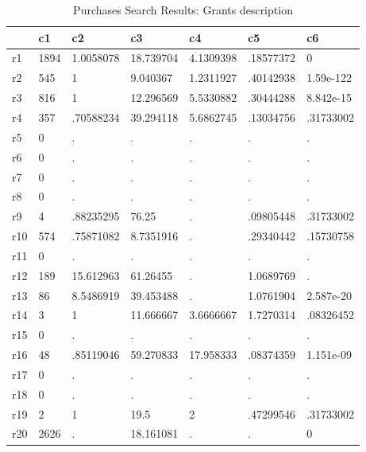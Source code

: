\begin{table}[htbp]
\caption{\label{taba3} Purchases Search Results: Grants description}\centering\medskip
\begin{tabular}{|l|l|l|l|l|l|l|}\hline  
 & c1  & c2  & c3  & c4  & c5  & c6  \\ \hline  
r1 & 1894 & 1.0058078 & 18.739704 & 4.1309398 & .18577372 & 0 \\ \hline 
r2 & 545 & 1 & 9.040367 & 1.2311927 & .40142938 & 1.59e-122 \\ \hline 
r3 & 816 & 1 & 12.296569 & 5.5330882 & .30444288 & 8.842e-15 \\ \hline 
r4 & 357 & .70588234 & 39.294118 & 5.6862745 & .13034756 & .31733002 \\ \hline 
r5 & 0 & . & . & . & . & . \\ \hline 
r6 & 0 & . & . & . & . & . \\ \hline 
r7 & 0 & . & . & . & . & . \\ \hline 
r8 & 0 & . & . & . & . & . \\ \hline 
r9 & 4 & .88235295 & 76.25 & . & .09805448 & .31733002 \\ \hline 
r10 & 574 & .75871082 & 8.7351916 & . & .29340442 & .15730758 \\ \hline 
r11 & 0 & . & . & . & . & . \\ \hline 
r12 & 189 & 15.612963 & 61.26455 & . & 1.0689769 & . \\ \hline 
r13 & 86 & 8.5486919 & 39.453488 & . & 1.0761904 & 2.587e-20 \\ \hline 
r14 & 3 & 1 & 11.666667 & 3.6666667 & 1.7270314 & .08326452 \\ \hline 
r15 & 0 & . & . & . & . & . \\ \hline 
r16 & 48 & .85119046 & 59.270833 & 17.958333 & .08374359 & 1.151e-09 \\ \hline 
r17 & 0 & . & . & . & . & . \\ \hline 
r18 & 0 & . & . & . & . & . \\ \hline 
r19 & 2 & 1 & 19.5 & 2 & .47299546 & .31733002 \\ \hline 
r20 & 2626 & . & 18.161081 & . & . & 0 \\ \hline 
  \end{tabular}
\end{table}
